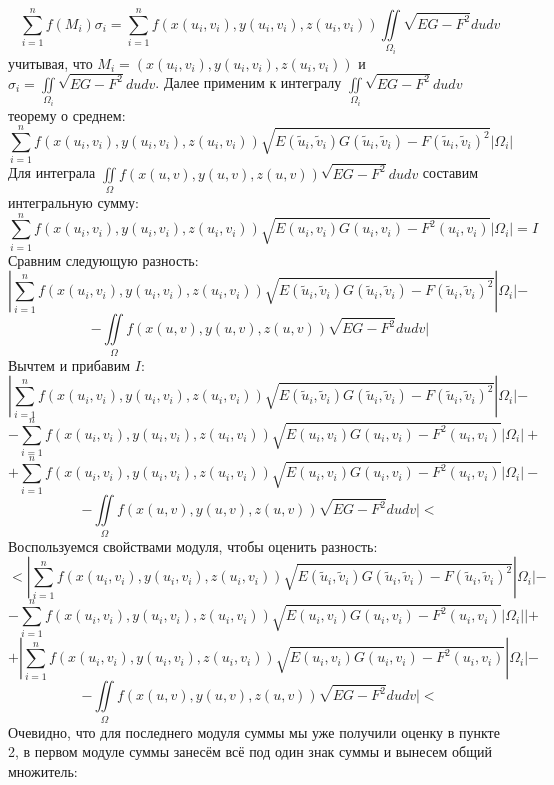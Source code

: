 \documentclass[12pt,a4paper]{article}
\begin{document}
	\[ \sum\limits_{i=1}^n f(M_{i})\sigma_{i} = \sum\limits_{i=1}^n f(x(u_{i}, v_{i}),y(u_{i}, v_{i}),z(u_{i}, v_{i}))\iint\limits_{\Omega_{i}} \sqrt{EG - F^2} dudv \]
	учитывая, что $M_{i} = (x(u_{i}, v_{i}),y(u_{i}, v_{i}),z(u_{i}, v_{i}))$ и $\sigma_{i} = \iint\limits_{\Omega_{i}} \sqrt{EG - F^2} dudv$. Далее применим к интегралу $\iint\limits_{\Omega_{i}} \sqrt{EG - F^2} dudv$ теорему о среднем:
	\[ \sum\limits_{i=1}^n f(x(u_{i}, v_{i}),y(u_{i}, v_{i}),z(u_{i}, v_{i}))\sqrt{E(\tilde u_{i}, \tilde v_{i}) G(\tilde u_{i}, \tilde v_{i}) - F(\tilde u_{i}, \tilde v_{i})^2}|\Omega_{i}| \]
	\newline
	Для интеграла $\iint\limits_{\Omega} f(x(u,v), y(u,v), z(u,v)) \sqrt{EG - F^2} dudv$ составим интегральную сумму:
	\[ \sum\limits_{i=1}^n f(x(u_{i},v_{i}), y(u_{i},v_{i}), z(u_{i},v_{i})) \sqrt{E(u_{i},v_{i})G(u_{i},v_{i}) - F^2(u_{i},v_{i})}|\Omega_{i}| = I \]
	\newline
	Сравним следующую разность:
	\[ | \sum\limits_{i=1}^n f(x(u_{i}, v_{i}),y(u_{i}, v_{i}),z(u_{i}, v_{i}))\sqrt{E(\tilde u_{i}, \tilde v_{i}) G(\tilde u_{i}, \tilde v_{i}) - F(\tilde u_{i}, \tilde v_{i})^2}|\Omega_{i}|  - \]
	\[ - \iint\limits_{\Omega} f(x(u,v), y(u,v), z(u,v)) \sqrt{EG - F^2} dudv |\]
	Вычтем и прибавим $I$:
	\[ | \sum\limits_{i=1}^n f(x(u_{i}, v_{i}),y(u_{i}, v_{i}),z(u_{i}, v_{i}))\sqrt{E(\tilde u_{i}, \tilde v_{i}) G(\tilde u_{i}, \tilde v_{i}) - F(\tilde u_{i}, \tilde v_{i})^2}|\Omega_{i}|  - \]
	\[ - \sum\limits_{i=1}^n f(x(u_{i},v_{i}), y(u_{i},v_{i}), z(u_{i},v_{i})) \sqrt{E(u_{i},v_{i})G(u_{i},v_{i}) - F^2(u_{i},v_{i})}|\Omega_{i}| + \]
	\[ + \sum\limits_{i=1}^n f(x(u_{i},v_{i}), y(u_{i},v_{i}), z(u_{i},v_{i})) \sqrt{E(u_{i},v_{i})G(u_{i},v_{i}) - F^2(u_{i},v_{i})}|\Omega_{i}| - \]
	\[ - \iint\limits_{\Omega} f(x(u,v), y(u,v), z(u,v)) \sqrt{EG - F^2} dudv | <\]
	Воспользуемся свойствами модуля, чтобы оценить разность:
	\[ < | \sum\limits_{i=1}^n f(x(u_{i}, v_{i}),y(u_{i}, v_{i}),z(u_{i}, v_{i}))\sqrt{E(\tilde u_{i}, \tilde v_{i}) G(\tilde u_{i}, \tilde v_{i}) - F(\tilde u_{i}, \tilde v_{i})^2}|\Omega_{i}|  - \]
	\[ - \sum\limits_{i=1}^n f(x(u_{i},v_{i}), y(u_{i},v_{i}), z(u_{i},v_{i})) \sqrt{E(u_{i},v_{i})G(u_{i},v_{i}) - F^2(u_{i},v_{i})}|\Omega_{i}| |+ \]
	\[ + | \sum\limits_{i=1}^n f(x(u_{i},v_{i}), y(u_{i},v_{i}), z(u_{i},v_{i})) \sqrt{E(u_{i},v_{i})G(u_{i},v_{i}) - F^2(u_{i},v_{i})}|\Omega_{i}| - \]
	\[ - \iint\limits_{\Omega} f(x(u,v), y(u,v), z(u,v)) \sqrt{EG - F^2} dudv | <\]
	Очевидно, что для последнего модуля суммы мы уже получили оценку в пункте 2, в первом модуле суммы занесём всё под один знак суммы и вынесем общий множитель:
\end{document}
